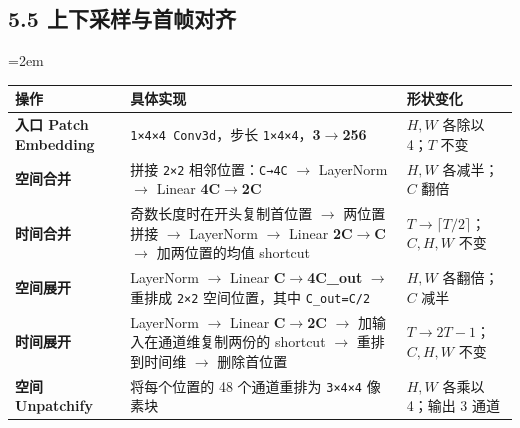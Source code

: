 \documentclass[
  11pt,
  a4paper,
  fontset=none]{ctexart}
\newcounter{none} %
\newcommand{\NotesTableStyle}{\linespread{1}\fontsize{9.5pt}{13pt}\selectfont\setlength{\tabcolsep}{4pt}\renewcommand{\arraystretch}{1.1}\setlength{\extrarowheight}{5pt}\setlength{\LTpre}{5pt}\setlength{\LTpost}{6pt}\setlength{\parskip}{0pt}\emergencystretch=2em}
\begin{document}
\clearpage

\subsection{5.5 上下采样与首帧对齐}\label{flux3-sampling}

\begingroup\NotesTableStyle\fontsize{10.5pt}{14pt}\selectfont\renewcommand{\arraystretch}{1.08}\setlength{\extrarowheight}{3pt}

{\def\LTcaptype{none} %
\begin{longtable}[]{@{}
  >{\raggedright\arraybackslash}p{}
  >{\raggedright\arraybackslash}p{}
  >{\raggedright\arraybackslash}p{}@{}}
\toprule\noalign{}
\begin{minipage}[b]{\linewidth}\raggedright
操作
\end{minipage} & \begin{minipage}[b]{\linewidth}\raggedright
具体实现
\end{minipage} & \begin{minipage}[b]{\linewidth}\raggedright
形状变化
\end{minipage} \\
\midrule\noalign{}
\endhead
\bottomrule\noalign{}
\endlastfoot
\textbf{入口 Patch Embedding} & \texttt{1×4×4\ Conv3d}，步长
\texttt{1×4×4}，\textbf{3\(\rightarrow\)256} & \(H,W\) 各除以 4；\(T\)
不变 \\
\textbf{空间合并} & 拼接 \texttt{2×2} 相邻位置：\texttt{C→4C}
\(\rightarrow\) LayerNorm \(\rightarrow\) Linear
\textbf{4C\(\rightarrow\)2C} & \(H,W\) 各减半；\(C\) 翻倍 \\
\textbf{时间合并} & 奇数长度时在开头复制首位置 \(\rightarrow\)
两位置拼接 \(\rightarrow\) LayerNorm \(\rightarrow\) Linear
\textbf{2C\(\rightarrow\)C} \(\rightarrow\) 加两位置的均值 shortcut &
\(T\rightarrow\lceil T/2\rceil\)；\(C,H,W\) 不变 \\
\textbf{空间展开} & LayerNorm \(\rightarrow\) Linear
\textbf{C\(\rightarrow\)4C\_out} \(\rightarrow\) 重排成 \texttt{2×2}
空间位置，其中 \texttt{C\_out=C/2} & \(H,W\) 各翻倍；\(C\) 减半 \\
\textbf{时间展开} & LayerNorm \(\rightarrow\) Linear
\textbf{C\(\rightarrow\)2C} \(\rightarrow\) 加输入在通道维复制两份的
shortcut \(\rightarrow\) 重排到时间维 \(\rightarrow\) 删除首位置 &
\(T\rightarrow2T-1\)；\(C,H,W\) 不变 \\
\textbf{空间 Unpatchify} & 将每个位置的 48 个通道重排为 \texttt{3×4×4}
像素块 & \(H,W\) 各乘以 4；输出 3 通道 \\
\end{longtable}
}
\end{document}
